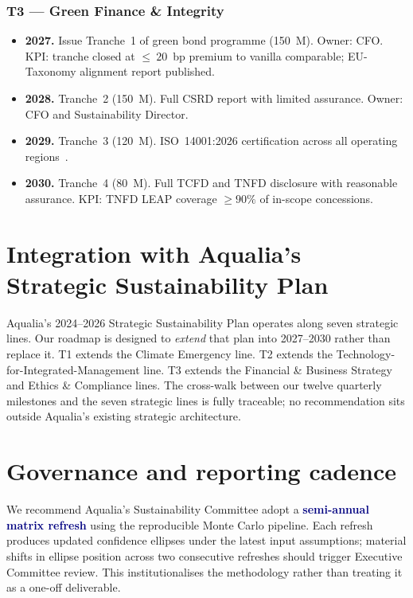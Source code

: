\documentclass[11pt, a4paper, twoside, openright]{scrreprt}
\newcommand{\euro}{\texteuro}
\newcommand{\signalword}[1]{\textbf{\textcolor{navy}{#1}}}
\begin{document}
\subsubsection{T3 --- Green Finance \& Integrity}

\begin{itemize}
\item \textbf{2027.} Issue Tranche~1 of green bond programme (\euro{}150~M). Owner: CFO. KPI: tranche closed at $\leq~20$~bp premium to vanilla comparable; EU-Taxonomy alignment report published.
\item \textbf{2028.} Tranche~2 (\euro{}150~M). Full CSRD report with limited assurance. Owner: CFO and Sustainability Director.
\item \textbf{2029.} Tranche~3 (\euro{}120~M). ISO~14001:2026 certification across all operating regions~\cite{iso14001}.
\item \textbf{2030.} Tranche~4 (\euro{}80~M). Full TCFD and TNFD disclosure with reasonable assurance. KPI: TNFD LEAP coverage $\geq 90\%$ of in-scope concessions.
\end{itemize}

\section{Integration with Aqualia's Strategic Sustainability Plan}

Aqualia's 2024--2026 Strategic Sustainability Plan operates along seven strategic lines. Our roadmap is designed to \emph{extend} that plan into 2027--2030 rather than replace it. T1 extends the Climate Emergency line. T2 extends the Technology-for-Integrated-Management line. T3 extends the Financial \& Business Strategy and Ethics \& Compliance lines. The cross-walk between our twelve quarterly milestones and the seven strategic lines is fully traceable; no recommendation sits outside Aqualia's existing strategic architecture.

\section{Governance and reporting cadence}

We recommend Aqualia's Sustainability Committee adopt a \signalword{semi-annual matrix refresh} using the reproducible Monte Carlo pipeline. Each refresh produces updated confidence ellipses under the latest input assumptions; material shifts in ellipse position across two consecutive refreshes should trigger Executive Committee review. This institutionalises the methodology rather than treating it as a one-off deliverable.
\end{document}
